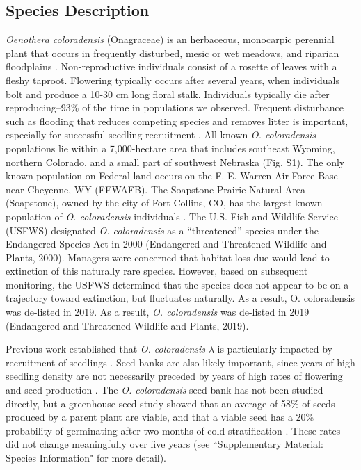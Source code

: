 \documentclass[12pt, letterpaper]{article}
\begin{document}
\subsection{Species Description}  
\textit{Oenothera coloradensis} (Onagraceae) \cite{Wagner2013-ii} is an herbaceous, monocarpic perennial plant that occurs in frequently disturbed, mesic or wet meadows, and riparian floodplains \cite{Fertig2000-ow}. Non-reproductive individuals consist of a rosette of leaves with a fleshy taproot. Flowering typically occurs after several years, when individuals bolt and produce a 10-30 cm long floral stalk. Individuals typically die after reproducing–93\% of the time in populations we observed. Frequent disturbance such as flooding that reduces competing species and removes litter is important, especially for successful seedling recruitment \cite{Fertig2000-ow}. All known \textit{O. coloradensis} populations lie within a 7,000-hectare area that includes southeast Wyoming, northern Colorado, and a small part of southwest Nebraska (Fig. S1). The only known population on Federal land occurs on the F. E. Warren Air Force Base near Cheyenne, WY (FEWAFB). The Soapstone Prairie Natural Area (Soapstone), owned by the city of Fort Collins, CO, has the largest known population of \textit{O. coloradensis} individuals \cite{Heidel202133-YearWyoming}. The U.S. Fish and Wildlife Service (USFWS) designated \textit{O. coloradensis} as a “threatened” species under the Endangered Species Act in 2000 (Endangered and Threatened Wildlife and Plants, 2000). Managers were concerned that habitat loss due would lead to extinction of this naturally rare species. However, based on subsequent monitoring, the USFWS determined that the species does not appear to be on a trajectory toward extinction, but fluctuates naturally. As a result, O. coloradensis was de-listed in 2019. As a result, \textit{O. coloradensis} was de-listed in 2019 (Endangered and Threatened Wildlife and Plants, 2019).
\nocite{USFWS2019}
\nocite{USFWS2000}

Previous work established that \textit{O. coloradensis} $\lambda$ is particularly impacted by recruitment of seedlings \cite{Floyd1998}. Seed banks are also likely important, since years of high seedling density are not necessarily preceded by years of high rates of flowering and seed production \cite{Heidel202133-YearWyoming}. The \textit{O. coloradensis} seed bank has not been studied directly, but a greenhouse seed study showed that an average of 58\% of seeds produced by a parent plant are viable, and that a viable seed has a 20\% probability of germinating after two months of cold stratification \cite{Burgess2005CapsuleColoradensis}. These rates did not change meaningfully over five years (see “Supplementary Material: Species Information" for more detail). 
\end{document}
